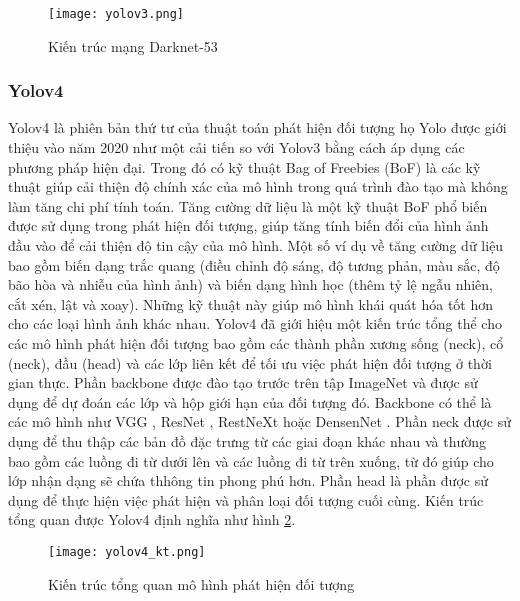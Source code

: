 \documentclass[../the.tex]{subfiles}
\begin{document}
\begin{figure}[H]
	\centering
	\texttt{[image: yolov3.png]}
	\caption{Kiến trúc mạng Darknet-53 \cite{detectiongao2021}}
	\label{fig:yolov3}
\end{figure}
\bigskip
\subsubsection{Yolov4}
{\fontsize{13}{12} \selectfont
	Yolov4 là phiên bản thứ tư của thuật toán phát hiện đối tượng họ Yolo được giới thiệu vào năm 2020 \cite{bochkovskiy2020yolov4} như một cải tiến so với Yolov3 bằng cách áp dụng các phương pháp hiện đại.
	Trong đó có kỹ thuật Bag of Freebies (BoF) là các kỹ thuật giúp cải thiện độ chính xác của mô hình trong quá trình đào tạo mà không làm tăng chi phí tính toán.
	Tăng cường dữ liệu là một kỹ thuật BoF phổ biến được sử dụng trong phát hiện đối tượng, giúp tăng tính biến đổi của hình ảnh đầu vào để cải thiện độ tin cậy của mô hình. Một số ví dụ về tăng cường dữ liệu bao gồm biến dạng trắc quang (điều chỉnh độ sáng, độ tương phản, màu sắc, độ bão hòa và nhiễu của hình ảnh) và biến dạng hình học (thêm tỷ lệ ngẫu nhiên, cắt xén, lật và xoay). Những kỹ thuật này giúp mô hình khái quát hóa tốt hơn cho các loại hình ảnh khác nhau.
	Yolov4 đã giới hiệu một kiến trúc tổng thể cho các mô hình phát hiện đối tượng bao gồm các thành phần xương sống (neck), cổ (neck), đầu (head) và các lớp liên kết để tối ưu việc phát hiện đối tượng ở thời gian thực. Phần backbone được đào tạo trước trên tập ImageNet và được sử dụng để dự đoán các lớp và hộp giới hạn của đối tượng đó.
	Backbone có thể là các mô hình như VGG \cite{simonyan2015deep}, ResNet \cite{he2015deep}, RestNeXt \cite{xie2017aggregated} hoặc DensenNet \cite{huang2018densely}.
	Phần neck được sử dụng để thu thập các bản đồ đặc trưng từ các giai đoạn khác nhau và thường bao gồm các luồng đi từ dưới lên và các luồng đi từ trên xuống, từ đó giúp cho lớp nhận dạng sẽ chứa thhông tin phong phú hơn. Phần head là phần được sử dụng để thực hiện việc phát hiện và phân loại đối tượng cuối cùng.
	Kiến trúc tổng quan được Yolov4 định nghĩa như hình \ref{fig:yolov4_1}.
}
\begin{figure}[H]
	\centering
	\texttt{[image: yolov4\_kt.png]}
	\caption{Kiến trúc tổng quan mô hình phát hiện đối tượng \cite{bochkovskiy2020yolov4}}
	\label{fig:yolov4_1}
\end{figure}
\end{document}
